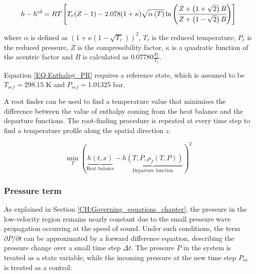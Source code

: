 \documentclass[a4paper,fleqn]{cas-dc}
\begin{document}
		{\scriptsize
			\begin{equation}
				{\color{black}h}-{\color{black}h}^{id}={\color{black}R}T \left[{\color{black}T_r}({\color{black}Z}-1) -2.078(1+{\color{black}\kappa} ){\sqrt { {\color{black}\alpha}\left(T\right) } } \ln \left(\cfrac{{\color{black}Z}+\left( 1+\sqrt{2} \right){\color{black}B}}{{\color{black}Z}+\left( 1-\sqrt{2} \right){\color{black}B}}\right)\right]
				\label{EQ:Enthalpy_PR}
			\end{equation}				
		}
		
		where $\alpha$ is defined as $\left( 1+\kappa \left( 1 - \sqrt{T_r} \right) \right)^2$, $T_r$ is the reduced temperature, $P_r$ is the reduced pressure, $Z$ is the compressibility factor, $\kappa$ is a quadratic function of the acentric factor and $B$ is calculated as $0.07780\frac{P_r}{T_r}$.
		
		Equation \ref{EQ:Enthalpy_PR} requires a reference state, which is assumed to be $T_{ref}=298.15$ K and $P_{ref}=1.01325$ bar.
		
		A root finder can be used to find a temperature value that minimises the difference between the value of enthalpy coming from the heat balance and the departure functions. The root-finding procedure is repeated at every time step to find a temperature profile along the spatial direction $z$.
		
		{\footnotesize
			\begin{equation}
				\min_T \left( \underbrace{h\left(t,x\right)}_{\text{Heat balance}} - \underbrace{h\left(T,P,\rho_f\left(T,P\right)\right)}_{\text{Departure function}} \right)^2
				\label{EQ:Enthalpy_root}
			\end{equation}
		}
		
		\subsubsection{Pressure term} \label{CH: Pressure}
		
		As explained in Section \ref{CH:Governing_equations_chapter}, the pressure in the low-velocity region remains nearly constant due to the small pressure wave propagation occurring at the speed of sound. Under such conditions, the term $\partial P/\partial t$ can be approximated by a forward difference equation, describing the pressure change over a small time step $\Delta t$. The pressure $P$ in the system is treated as a state variable, while the incoming pressure at the new time step $P_{in}$ is treated as a control:
		
\end{document}
